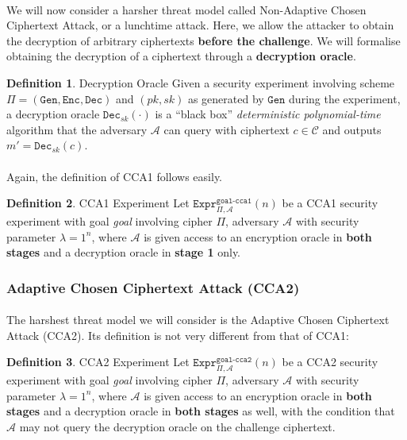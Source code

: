 \documentclass{article}
\theoremstyle{definition}
\newtheorem{definition}{Definition}[section]
\theoremstyle{example}
\newcommand{\Enc}{\texttt{Enc}}
\newcommand{\Dec}{\texttt{Dec}}
\newcommand{\Gen}{\texttt{Gen}}
\renewcommand{\C}{\mathcal{C}}
\newcommand{\A}{\mathcal{A}}
\newcommand{\Expr}[2]{\texttt{Expr}^{\texttt{#1}}_{#2}}
\begin{document}
\paragraph{} We will now consider a harsher threat model called Non-Adaptive
Chosen Ciphertext Attack, or a lunchtime attack. Here, we allow the attacker to
obtain the decryption of arbitrary ciphertexts \textbf{before the challenge}.
We will formalise obtaining the decryption of a ciphertext through a
\textbf{decryption oracle}.
\begin{definition}{Decryption Oracle}
  Given a security experiment involving scheme $\Pi = (\Gen, \Enc, \Dec)$ and
  $(pk, sk)$ as generated by $\Gen$ during the experiment, a decryption oracle
  $\Dec_{sk}(\cdot)$ is a ``black box'' \textit{deterministic polynomial-time}
  algorithm that the adversary $\A$ can query with ciphertext $c\in \C$ and
  outputs $m' = \Dec_{sk}(c)$.
\end{definition}
\paragraph{} Again, the definition of CCA1 follows easily.
\begin{definition}{CCA1 Experiment}
  Let $\Expr{goal-cca1}{\Pi, \A}(n)$ be a CCA1 security experiment with goal
  \textit{goal} involving
  cipher $\Pi$, adversary $\A$ with security parameter $\lambda = 1^n$, where
  $\A$ is given access to an encryption oracle in \textbf{both stages} and a
  decryption oracle in \textbf{stage 1} only.
\end{definition}
\subsubsection{Adaptive Chosen Ciphertext Attack (CCA2)}
\paragraph{} The harshest threat model we will consider is the Adaptive Chosen
Ciphertext Attack (CCA2). Its definition is not very different from that of CCA1:
\begin{definition}{CCA2 Experiment}
  Let $\Expr{goal-cca2}{\Pi, \A}(n)$ be a CCA2 security experiment with goal
  \textit{goal} involving
  cipher $\Pi$, adversary $\A$ with security parameter $\lambda = 1^n$, where
  $\A$ is given access to an encryption oracle in \textbf{both stages} and a
  decryption oracle in \textbf{both stages} as well, with the condition that
  $\A$ may not query the decryption oracle on the challenge ciphertext.
\end{definition}
\end{document}
